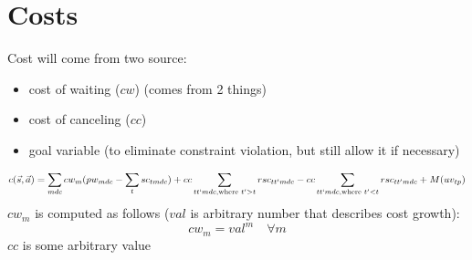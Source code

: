 \documentclass{article}
\begin{document}
\section{Costs}
Cost will come from two source:  
\begin{itemize} 
	\item cost of waiting ($cw$) (comes from 2 things)
	\item cost of canceling ($cc$)
	\item goal variable (to eliminate constraint violation, but still allow it if necessary)
\end{itemize}
\[ c(\vec{s}, \vec{a}) = \sum_{mdc} cw_{m} (pw_{mdc}- \sum_{t} sc_{tmdc}) + cc \sum_{tt`mdc, \text{where } t' > t} rsc_{tt'mdc} 
- cc \sum_{tt`mdc, \text{where } t' < t} rsc_{tt'mdc} + M (uv_{tp})\]
$cw_{m}$ is computed as follows ($val$ is arbitrary number that describes cost growth):
	\[ cw_{m} = val^m \quad \forall m \]
$cc$ is some arbitrary value
\end{document}
